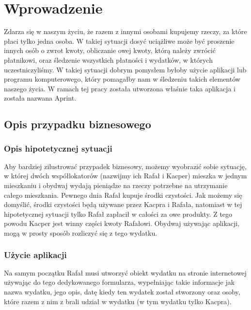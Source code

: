 \newpage %
\section{Wprowadzenie}
Zdarza się w naszym życiu, że razem z innymi osobami kupujemy rzeczy, za które płaci tylko jedna osoba. W takiej sytuacji dosyć uciążliwe może być proszenie innych osób o zwrot kwoty, obliczanie owej kwoty, którą należy zwrócić płatnikowi, oraz śledzenie wszystkich płatności i wydatków, w których uczestniczyliśmy. W takiej sytuacji dobrym pomysłem byłoby użycie aplikacji lub programu komputerowego, który pomagałby nam w śledzeniu takich elementów naszego życia. W ramach tej pracy została utworzona właśnie taka aplikacja i została nazwana Aprint.

\subsection{Opis przypadku biznesowego}
\subsubsection{Opis hipotetycznej sytuacji}

Aby bardziej zilustrować przypadek biznesowy, możemy wyobrazić sobie sytuację, w której dwóch współlokatorów (nazwijmy ich Rafał i Kacper) mieszka w jednym mieszkaniu i obydwaj wydają pieniądze na rzeczy potrzebne na utrzymanie całego mieszkania. Pewnego dnia Rafał kupuje środki czystości. Jak możemy się domyślić, środki czystości będą używane przez Kacpra i Rafała, natomiast w tej hipotetycznej sytuacji tylko Rafał zapłacił w całości za owe produkty. Z tego powodu Kacper jest winny części kwoty Rafałowi. Obydwaj używając aplikacji, mogą w prosty sposób rozliczyć się z tego wydatku.

\subsubsection{Użycie aplikacji}

Na samym początku Rafał musi utworzyć obiekt wydatku na stronie internetowej używając do tego dedykowanego formularza, wypełniając takie informacje jak nazwa wydatku, jego opis, datę kiedy ten wydatek został stworzony oraz osoby, które razem z nim z brali udział w wydatku (w tym wydatku tylko Kacpra).

